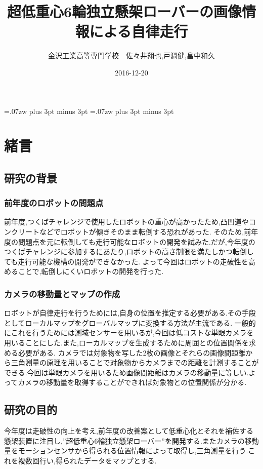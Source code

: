\documentclass[twocolumn,11pt]{sotsuken_abst}
\title{超低重心6輪独立懸架ローバーの画像情報による自律走行}
\author{金沢工業高等専門学校　佐々井翔也,戸澗健,畠中和久}
\date{2016-12-20}
\begin{document}
\maketitle
\thispagestyle{fancy}
\pagestyle{fancy}

\setlength{\baselineskip}{5.6truemm}
\kanjiskip=.07zw plus 3pt minus 3pt
\xkanjiskip=.07zw plus 3pt minus 3pt

\section{緒言}
\subsection{研究の背景}

\subsubsection{前年度のロボットの問題点}
前年度,つくばチャレンジで使用したロボットの重心が高かったため,凸凹道やコンクリートなどでロボットが傾きそのまま転倒する恐れがあった.
そのため,前年度の問題点を元に転倒しても走行可能なロボットの開発を試みた.だが,今年度のつくばチャレンジに参加するにあたり,ロボットの高さ制限を満たしかつ転倒しても走行可能な機構の開発ができなかった.
よって今回はロボットの走破性を高めることで,転倒しにくいロボットの開発を行った.
\subsubsection{カメラの移動量とマップの作成}
ロボットが自律走行を行うためには,自身の位置を推定する必要がある.その手段としてローカルマップをグローバルマップに変換する方法が主流である.
一般的にこれを行うためには測域センサーを用いるが,今回は低コストな単眼カメラを用いることにした.また,ローカルマップを生成するために周囲との位置関係を求める必要がある.
カメラでは対象物を写した2枚の画像とそれらの画像間距離から三角測量の原理を用いることで対象物からカメラまでの距離を計測することができる.今回は単眼カメラを用いるため画像間距離はカメラの移動量に等しい.よってカメラの移動量を取得することができれば対象物との位置関係が分かる.

\subsection{研究の目的}
今年度は走破性の向上を考え,前年度の改善案として低重心化とそれを補佐する懸架装置に注目し,”超低重心6輪独立懸架ローバー”を開発する.またカメラの移動量をモーションセンサから得られる位置情報によって取得し,三角測量を行う.これを複数回行い,得られたデータをマップとする.
\end{document}
